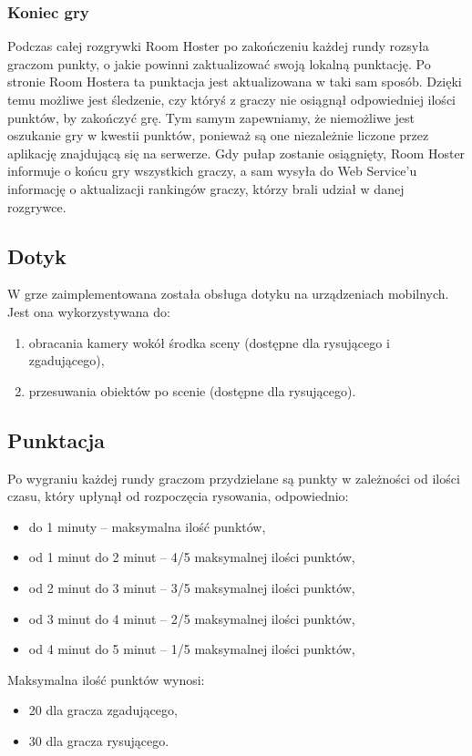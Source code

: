 \subsubsection{Koniec gry}
Podczas całej rozgrywki Room Hoster po zakończeniu każdej rundy rozsyła graczom punkty, o jakie powinni zaktualizować swoją lokalną punktację. Po stronie Room Hostera ta punktacja jest aktualizowana w taki sam sposób. Dzięki temu możliwe jest śledzenie, czy któryś z graczy nie osiągnął odpowiedniej ilości punktów, by zakończyć grę. Tym samym zapewniamy, że niemożliwe jest oszukanie gry w kwestii punktów, ponieważ są one niezależnie liczone przez aplikację znajdującą się na serwerze. Gdy pułap zostanie osiągnięty, Room Hoster informuje o końcu gry wszystkich graczy, a sam wysyła do Web Service'u informację o aktualizacji rankingów graczy, którzy brali udział w danej rozgrywce.

\subsection{Dotyk}
W grze zaimplementowana została obsługa dotyku na urządzeniach mobilnych. Jest ona wykorzystywana do:
\begin{enumerate}
	\item obracania kamery wokół środka sceny (dostępne dla rysującego i zgadującego),
	\item przesuwania obiektów po scenie (dostępne dla rysującego).
\end{enumerate}

\subsection{Punktacja}
Po wygraniu każdej rundy graczom przydzielane są punkty w zależności od ilości czasu, który upłynął od rozpoczęcia rysowania, odpowiednio:
\begin{itemize}
    \item do 1 minuty – maksymalna ilość punktów,
    \item od 1 minut do 2 minut – 4/5 maksymalnej ilości punktów,
    \item od 2 minut do 3 minut – 3/5 maksymalnej ilości punktów,
    \item od 3 minut do 4 minut – 2/5 maksymalnej ilości punktów,
    \item od 4 minut do 5 minut – 1/5 maksymalnej ilości punktów,
\end{itemize}
Maksymalna ilość punktów wynosi:
\begin{itemize}
    \item 20 dla gracza zgadującego,
    \item 30 dla gracza rysującego.
\end{itemize}


